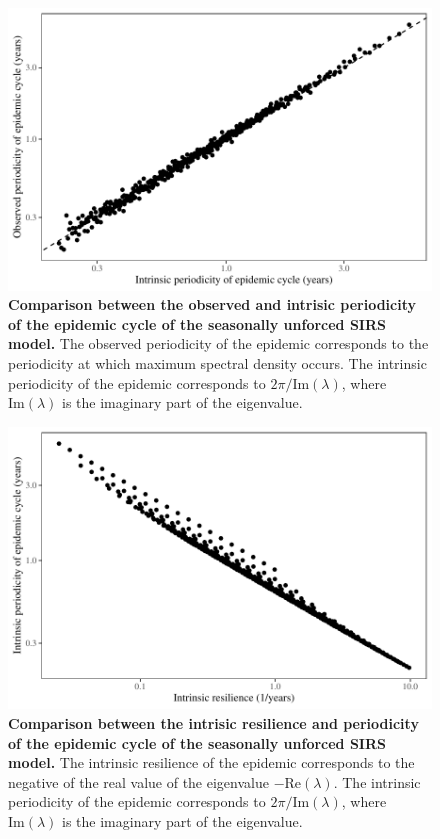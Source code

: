 \documentclass[12pt]{article}
\begin{document}
\begin{figure}[!th]
\begin{center}
\includegraphics[width=\textwidth]{../figure6/figure_persistence_noise_period.pdf}
\caption{
\textbf{Comparison between the observed and intrisic periodicity of the epidemic cycle of the seasonally unforced SIRS model.}
The observed periodicity of the epidemic corresponds to the periodicity at which maximum spectral density occurs.
The intrinsic periodicity of the epidemic corresponds to $2 \pi/\mathrm{Im}(\lambda)$, where $\mathrm{Im}(\lambda)$ is the imaginary part of the eigenvalue.
}
\end{center}
\end{figure}

\pagebreak

\begin{figure}[!th]
\begin{center}
\includegraphics[width=\textwidth]{../figure6/figure_persistence_noise_resilience_period.pdf}
\caption{
\textbf{Comparison between the intrisic resilience and periodicity of the epidemic cycle of the seasonally unforced SIRS model.}
The intrinsic resilience of the epidemic corresponds to the negative of the real value of the eigenvalue $-\mathrm{Re}(\lambda)$.
The intrinsic periodicity of the epidemic corresponds to $2 \pi/\mathrm{Im}(\lambda)$, where $\mathrm{Im}(\lambda)$ is the imaginary part of the eigenvalue.
}
\end{center}
\end{figure}
\end{document}
